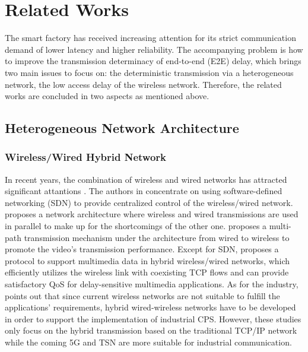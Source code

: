 \documentclass{SCIS2021}
\begin{document}
	
	\section{Related Works}
	\label{related}
	The smart factory has received increasing attention for its strict communication demand of lower latency and higher reliability. The accompanying problem is how to improve the transmission determinacy of end-to-end (E2E) delay, which brings two main issues to focus on: the deterministic transmission via a heterogeneous network, the low access delay of the wireless network. Therefore, the related works are concluded in two aspects as mentioned above.
	
	
	\subsection{Heterogeneous Network Architecture}
	
	\subsubsection{Wireless/Wired Hybrid Network}
	In recent years, the combination of wireless and wired networks has attracted significant attantions \cite{fu2018software,ke2017improving,cai2006qos,underberg2018towards}. The authors in\cite{fu2018software,ke2017improving} concentrate on using software-defined networking (SDN) to provide centralized control of the wireless/wired network. \cite{fu2018software} proposes a network architecture where wireless and wired transmissions are used in parallel to make up for the shortcomings of the other one. \cite{ke2017improving} proposes a multi-path transmission mechanism under the architecture from wired to wireless to promote the video's transmission performance. Except for SDN, \cite{cai2006qos} proposes a protocol to support multimedia data in hybrid wireless/wired networks, which efficiently utilizes the wireless link with coexisting TCP flows and can provide satisfactory QoS for delay-sensitive multimedia applications. As for the industry, \cite{underberg2018towards} points out that since current wireless networks are not suitable to fulfill the applications' requirements, hybrid wired-wireless networks have to be developed in order to support the implementation of industrial CPS. However, these studies only focus on the hybrid transmission based on the traditional TCP/IP network while the coming 5G and TSN are more suitable for industrial communication.
	
	
\end{document}
